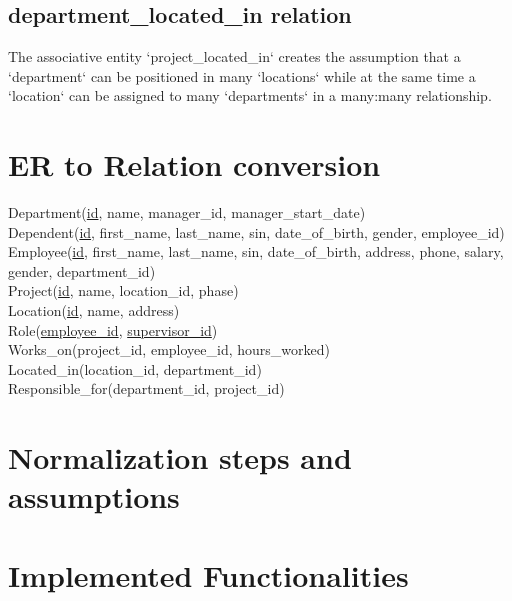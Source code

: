 \documentclass[11pt,letterpaper]{article}
\begin{document}
\subsection{department\_located\_in relation}
The associative entity `project\_located\_in` creates the assumption that a `department` can be positioned in many `locations` while at the same time a `location` can be assigned to many `departments` in a many:many relationship.

\section{ER to Relation conversion }

Department(\uline{id}, name, manager\_id, manager\_start\_date)\\
Dependent(\uline{id}, first\_name, last\_name, sin, date\_of\_birth, gender, employee\_id)\\
Employee(\uline{id}, first\_name, last\_name, sin, date\_of\_birth, address, phone, salary, gender, department\_id)\\
Project(\uline{id}, name, location\_id, phase)\\
Location(\uline{id}, name, address)\\
Role(\uline{employee\_id}, \uline{supervisor\_id})\\
Works\_on(project\_id, employee\_id, hours\_worked)\\
Located\_in(location\_id, department\_id)\\
Responsible\_for(department\_id, project\_id)\\
\section {Normalization steps and assumptions}

\section{Implemented Functionalities}
\end{document}

